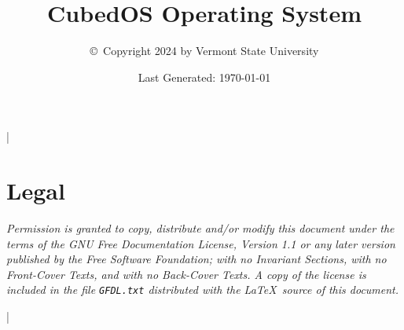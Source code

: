 \documentclass{scrreprt}
\begin{document}
\title{CubedOS Operating System}
\author{\copyright\ Copyright 2024 by Vermont State University}
\date{Last Generated: \today}
\maketitle

\tableofcontents

\lstMakeShortInline|

\section*{Legal}
\label{sec:legal}

\textit{Permission is granted to copy, distribute and/or modify this document under the terms of
the GNU Free Documentation License, Version 1.1 or any later version published by the Free
Software Foundation; with no Invariant Sections, with no Front-Cover Texts, and with no
Back-Cover Texts. A copy of the license is included in the file \texttt{GFDL.txt} distributed
with the \LaTeX\ source of this document.}






\lstDeleteShortInline|




\end{document}
